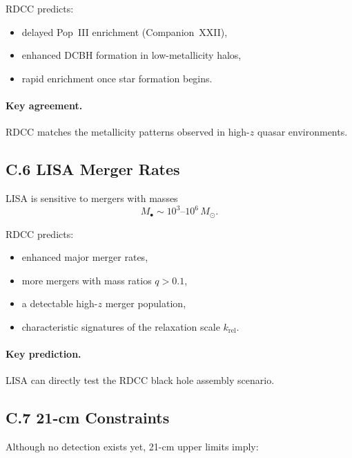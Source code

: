\documentclass[11pt,a4paper]{article}
\begin{document}
RDCC predicts:

\begin{itemize}
    \item delayed Pop~III enrichment (Companion~XXII),
    \item enhanced DCBH formation in low-metallicity halos,
    \item rapid enrichment once star formation begins.
\end{itemize}

\paragraph{Key agreement.}
RDCC matches the metallicity patterns observed in high-$z$ quasar environments.

\subsection*{C.6 LISA Merger Rates}

LISA is sensitive to mergers with masses
\begin{equation}
    M_{\bullet} \sim 10^{3}\text{--}10^{6}\,M_{\odot}.
\end{equation}

RDCC predicts:

\begin{itemize}
    \item enhanced major merger rates,
    \item more mergers with mass ratios $q > 0.1$,
    \item a detectable high-$z$ merger population,
    \item characteristic signatures of the relaxation scale $k_{\mathrm{rel}}$.
\end{itemize}

\paragraph{Key prediction.}
LISA can directly test the RDCC black hole assembly scenario.

\subsection*{C.7 21-cm Constraints}

Although no detection exists yet, 21-cm upper limits imply:
\end{document}
